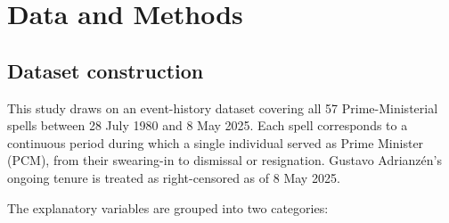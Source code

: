 \documentclass[a4paper, 12pt]{article}
\begin{document}
% 
% 
% 



\section{Data and Methods}

\subsection{Dataset construction}


This study draws on an event-history dataset covering all 57 Prime-Ministerial spells between 28 July 1980 and 8 May 2025. Each spell corresponds to a continuous period during which a single individual served as Prime Minister (PCM), from their swearing-in to dismissal or resignation. Gustavo Adrianzén’s ongoing tenure is treated as right-censored as of 8 May 2025.

The explanatory variables are grouped into two categories:
\end{document}
